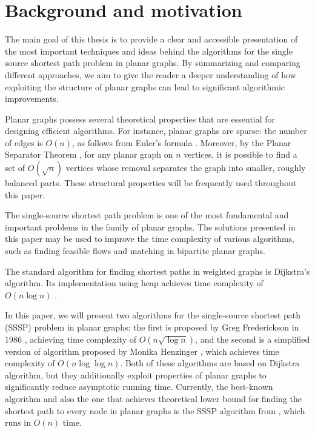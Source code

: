 \section{Background and motivation}
The main goal of this thesis is to provide a clear and accessible presentation of the most important techniques and ideas behind the algorithms for the single source shortest path problem in planar graphs. By summarizing and comparing different approaches, we aim to give the reader a deeper understanding of how exploiting the structure of planar graphs can lead to significant algorithmic improvements.

Planar graphs possess several theoretical properties that are essential for designing efficient algorithms. For instance, planar graphs are sparse: the number of edges is $O(n)$, as follows from Euler's formula \cite{wiki}. Moreover, by the Planar Separator Theorem \cite{separatorT}, for any planar graph on $n$ vertices, it is possible to find a set of $O(\sqrt{n})$ vertices whose removal separates the graph into smaller, roughly balanced parts. These structural properties will be frequently used throughout this paper.

The single-source shortest path problem is one of the most fundamental and important problems in the family of planar graphs. The solutions presented in this paper may be used to improve the time complexity of various algorithms, such as finding feasible flows and matching in bipartite planar graphs.

The standard algorithm for finding shortest paths in weighted graphs is Dijkstra's algorithm. Its implementation using heap achieves time complexity of $O(n \log n)$ \cite{dijkstraBound}.

In this paper, we will present two algorithms for the single-source shortest path (SSSP) problem in planar graphs: the first is proposed by Greg Frederickson in 1986 \cite{frederickson}, achieving time complexity of $O(n \sqrt{\log n}) $, and the second is a simplified version of algorithm proposed by Monika Henzinger \cite{henzinger}, which achieves time complexity of $O(n \log \log n)$. Both of these algorithms are based on Dijkstra algorithm, but they additionally exploit properties of planar graphs to significantly reduce asymptotic running time. Currently, the best-known algorithm and also the one that achieves theoretical lower bound for finding the shortest path to every node in planar graphs is the SSSP algorithm from \cite{henzinger}, which runs in $O(n)$ time.

